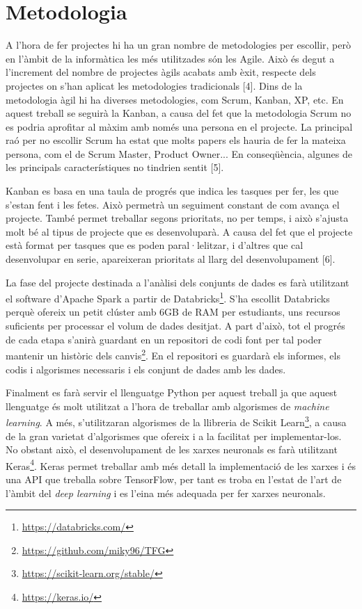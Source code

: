 \documentclass[10pt,a4paper,twocolumn,twoside]{article}
\begin{document}
\section {Metodologia}
A l'hora de fer projectes hi ha un gran nombre de metodologies per escollir, però en l'àmbit de la informàtica les més utilitzades són les Agile. Això és degut a l'increment del nombre de projectes àgils acabats amb èxit, respecte dels projectes on s'han aplicat les metodologies tradicionals [4]. Dins de la metodologia àgil hi ha diverses metodologies, com Scrum, Kanban, XP, etc. En aquest treball se seguirà la Kanban, a causa del fet que la metodologia Scrum no es podria aprofitar al màxim amb només una persona en el projecte. La principal raó per no escollir Scrum ha estat que molts papers els hauria de fer la mateixa persona, com el de Scrum Master, Product Owner... En conseqüència, algunes de les principals característiques no tindrien sentit [5].

Kanban es basa en una taula de progrés que indica les tasques per fer, les que s'estan fent i les fetes. Això permetrà un seguiment constant de com avança el projecte. També permet treballar segons prioritats, no per temps, i això s'ajusta molt bé al tipus de projecte que es desenvoluparà. A causa del fet que el projecte està format per tasques que es poden paral·lelitzar, i d'altres que cal desenvolupar en serie, apareixeran prioritats al llarg del desenvolupament [6].

La fase del projecte destinada a l'anàlisi dels conjunts de dades es farà utilitzant el software d'Apache Spark a partir de Databricks\footnote{\url{https://databricks.com/}}. S'ha escollit Databricks perquè ofereix un petit clúster amb 6GB de RAM per estudiants, uns recursos suficients per processar el volum de dades desitjat.
A part d'això, tot el progrés de cada etapa s'anirà guardant en un repositori de codi font per tal poder mantenir un històric dels canvis\footnote{\url{ https://github.com/miky96/TFG}}. En el repositori es guardarà els informes, els codis i algorismes necessaris i els conjunt de dades amb les dades.

Finalment es farà servir el llenguatge Python per aquest treball ja que aquest llenguatge és molt utilitzat a l'hora de treballar amb algorismes de \textit{machine learning}. A més, s'utilitzaran algorismes de la llibreria de Scikit Learn\footnote{\url{https://scikit-learn.org/stable/}}, a causa de la gran varietat d'algorismes que ofereix i a la facilitat per implementar-los. No obstant això, el desenvolupament de les xarxes neuronals es farà utilitzant Keras\footnote{\url{https://keras.io/}}. Keras permet treballar amb més detall la implementació de les xarxes i és una API que treballa sobre TensorFlow, per tant es troba en l'estat de l'art de l'àmbit del \textit{deep learning} i es l'eina més adequada per fer xarxes neuronals.
\end{document}
